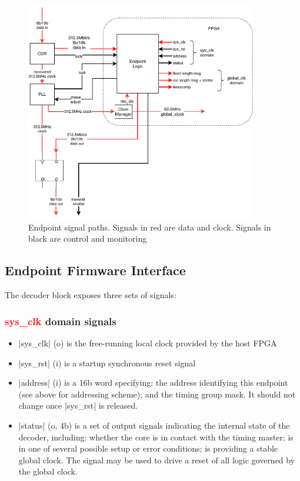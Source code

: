 \documentclass{dune}
\begin{document}
\begin{figure}[p]
	\centering
	\includegraphics[width=0.9\textwidth]{timing_endpoint_block.pdf}
	\caption{Endpoint signal paths. Signals in red are data and clock. Signals in black are control and monitoring}
	\label{fig:fw_if}
\end{figure}

\subsection{Endpoint Firmware Interface}

The decoder block exposes three sets of signals:

\subsubsection{\textcolor{red}{sys\_clk} domain signals}

\begin{itemize}
	\item |sys_clk| (o) is the free-running local clock provided by the host FPGA
	\item |sys_rst| (i) is a startup synchronous reset signal
	\item |address| (i) is a 16b word specifying: the address identifying this endpoint (see above for addressing scheme); and the timing group mask. It should not change once |sys_rst| is released.
	\item |status| (o, 4b) is a set of output signals indicating the internal state of the decoder, including: whether the core is in contact with the timing master; is in one of several possible setup or error conditions; is providing a stable global clock. The signal may be used to drive a reset of all logic governed by the global clock.
\end{itemize}
\end{document}
